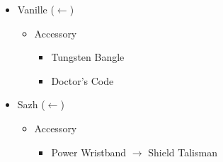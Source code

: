 \begin{menu}
\begin{multicols}{2}
\begin{itemize}
\begin{itemize}
        \item Vanille ($\leftarrow$)
              \begin{itemize}
                \item Accessory
                      \begin{itemize}
                        \item Tungsten Bangle
                        \item Doctor's Code
                      \end{itemize}
              \end{itemize}
        \item Sazh ($\leftarrow$)
              \begin{itemize}
                \item Accessory
                      \begin{itemize}
                        \item Power Wristband $\rightarrow$ Shield Talisman
                      \end{itemize}
              \end{itemize}
      \end{itemize}
    \end{itemize}
  \end{multicols}
\end{menu}

